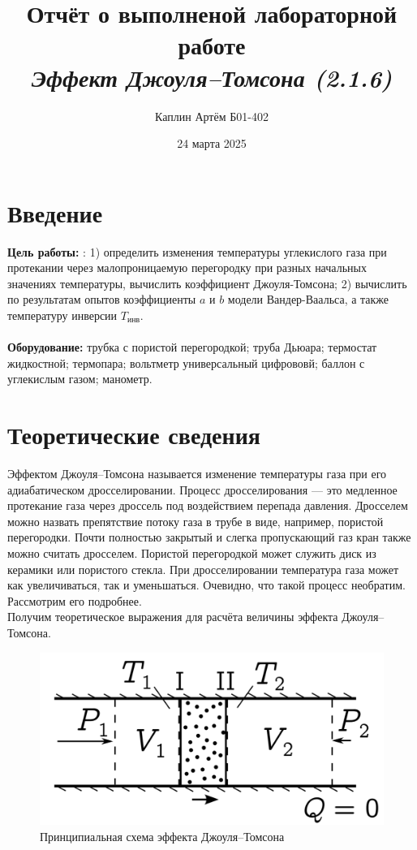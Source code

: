 \documentclass[a4paper,12pt]{article}
\title{\textbf{Отчёт о выполненой лабораторной работе \\ \textit{Эффект Джоуля–Томсона (2.1.6)}}}
\author{Каплин Артём Б01-402}
\date{24 марта 2025}
\begin{document}
\maketitle
	
	\section{Введение}
	
	\textbf{Цель работы:} : 1) определить изменения температуры углекислого газа при протекании через малопроницаемую перегородку при разных начальных значениях температуры, вычислить коэффициент Джоуля-Томсона; 2) вычислить по результатам опытов коэффициенты $a$ и $b$ модели Вандер-Ваальса, а также температуру инверсии $T_{\text{инв}}$.\\
    \\
    \textbf{Оборудование:} трубка с пористой перегородкой; труба Дьюара; термостат
    жидкостной; термопара; вольтметр универсальный цифрововй; баллон с углекислым газом; манометр.
	
	\section{Теоретические сведения }
    
Эффектом Джоуля–Томсона называется изменение температуры газа при его адиабатическом дросселировании. Процесс дросселирования — это медленное протекание газа через дроссель под воздействием перепада давления. Дросселем можно назвать препятствие потоку газа в трубе в виде, например, пористой перегородки. Почти полностью закрытый и слегка пропускающий газ кран также можно считать дросселем. Пористой перегородкой может служить диск из керамики или пористого стекла. При дросселировании температура газа может как увеличиваться, так и уменьшаться. Очевидно, что такой процесс необратим. Рассмотрим его подробнее.\\
 
Получим теоретическое выражения для расчёта величины эффекта Джоуля–Томсона.

\begin{figure}[h!]
        \centering
        \includegraphics[scale=0.2]{216.png}
        \caption{
         Принципиальная схема эффекта Джоуля–Томсона
        }
 \end{figure} 
\end{document}
